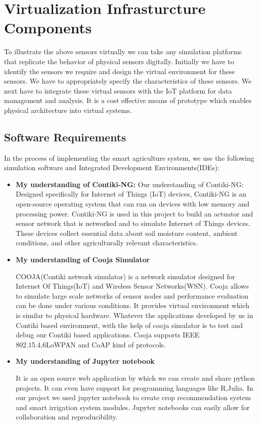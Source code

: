 \documentclass{article}
\begin{document}
\section{Virtualization Infrasturcture Components}
To illustrate the above sensors virtually we can take any simulation platforms that replicate the behavior of physical sensors digitally. Initially we have to identify the sensors we require and design the virtual environment for these sensors. We have to appropriately specify the characteristics of these sensors. We next have to integrate these virtual sensors with the IoT platform for data management and analysis. It is a cost effective means of prototype which enables physical architecture into virtual systems. 

\subsection{Software Requirements}
In the process of implementing the smart agriculture system, we use the following simulation software and Integrated Development Environments(IDEs):

\begin{itemize}
    \item \textbf{My understanding of Contiki-NG:}
    Our understanding of Contiki-NG: Designed specifically for Internet of Things (IoT) devices, Contiki-NG is an open-source operating system that can run on devices with low memory and processing power. Contiki-NG is used in this project to build an actuator and sensor network that is networked and to simulate Internet of Things devices. These devices collect essential data about soil moisture content, ambient conditions, and other agriculturally relevant characteristics.
\end{itemize}

\begin{itemize}
    \item \textbf{My understanding of Cooja Simulator}
    
COOJA(Contiki network simulator) is a network simulator designed for Internet Of Things(IoT) and Wireless Sensor Networks(WSN). Cooja allows to simulate large scale networks of sensor nodes and performance evaluation can be done under various conditions. It provides virtual environment which is similar to physical hardware. 
Whatever the applications developed by us in Contiki based environment, with the help of cooja simulator is to test and debug our Contiki based applications. Cooja supports IEEE 802.15.4,6LoWPAN and CoAP kind of protocols.

\end{itemize}
\begin{itemize}
    \item \textbf{My understanding of Jupyter notebook}
    
It is an open source web application by which we can create and share python projects. It can even have support for programming languages like R,Julia. In our project we used jupyter notebook to create crop recommendation system and smart irrigation system modules. Jupyter notebooks can easily allow for collaboration and reproducibility.

\end{itemize}
\end{document}
